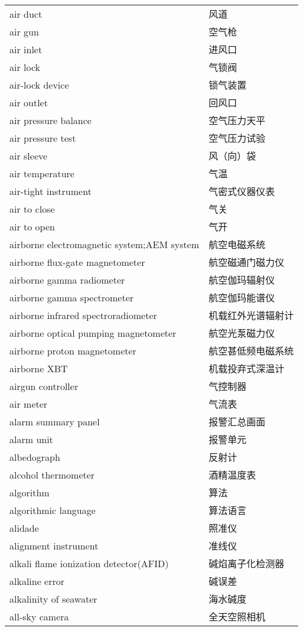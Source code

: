 \documentclass[
]{article}
\begin{document}
\begin{longtable}[]{@{}ll@{}}
air duct & 风道 \\
air gun & 空气枪 \\
air inlet & 进风口 \\
air lock & 气锁阀 \\
air-lock device & 锁气装置 \\
air outlet & 回风口 \\
air pressure balance & 空气压力天平 \\
air pressure test & 空气压力试验 \\
air sleeve & 风（向）袋 \\
air temperature & 气温 \\
air-tight instrument & 气密式仪器仪表 \\
air to close & 气关 \\
air to open & 气开 \\
airborne electromagnetic system;AEM system & 航空电磁系统 \\
airborne flux-gate magnetometer & 航空磁通门磁力仪 \\
airborne gamma radiometer & 航空伽玛辐射仪 \\
airborne gamma spectrometer & 航空伽玛能谱仪 \\
airborne infrared spectroradiometer & 机载红外光谱辐射计 \\
airborne optical pumping magnetometer & 航空光泵磁力仪 \\
airborne proton magnetometer & 航空甚低频电磁系统 \\
airborne XBT & 机载投弃式深温计 \\
airgun controller & 气控制器 \\
air meter & 气流表 \\
alarm summary panel & 报警汇总画面 \\
alarm unit & 报警单元 \\
albedograph & 反射计 \\
alcohol thermometer & 酒精温度表 \\
algorithm & 算法 \\
algorithmic language & 算法语言 \\
alidade & 照准仪 \\
alignment instrument & 准线仪 \\
alkali flame ionization detector(AFID) & 碱焰离子化检测器 \\
alkaline error & 碱误差 \\
alkalinity of seawater & 海水碱度 \\
all-sky camera & 全天空照相机 \\

\end{longtable}
\end{document}
